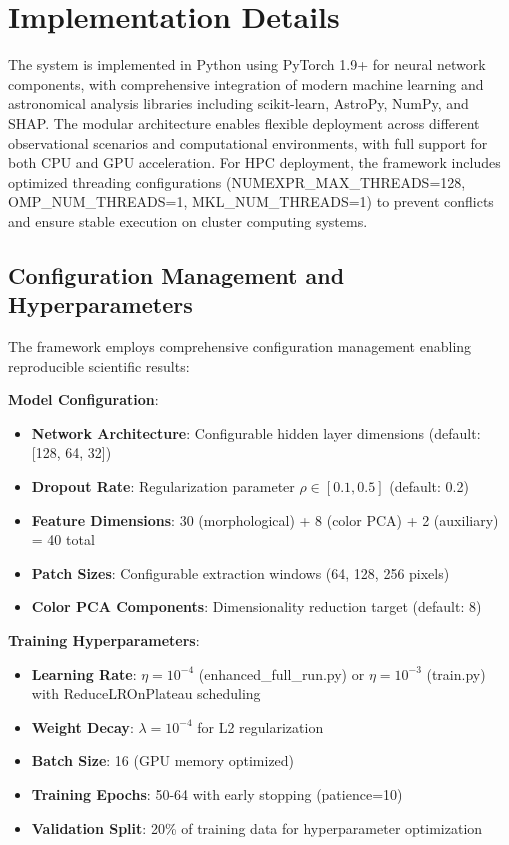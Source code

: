 \documentclass[twocolumn,10pt]{aastex631}
\begin{document}
\section{Implementation Details}

The system is implemented in Python using PyTorch 1.9+ for neural network components, with comprehensive integration of modern machine learning and astronomical analysis libraries including scikit-learn, AstroPy, NumPy, and SHAP. The modular architecture enables flexible deployment across different observational scenarios and computational environments, with full support for both CPU and GPU acceleration. For HPC deployment, the framework includes optimized threading configurations (NUMEXPR\_MAX\_THREADS=128, OMP\_NUM\_THREADS=1, MKL\_NUM\_THREADS=1) to prevent conflicts and ensure stable execution on cluster computing systems.

\subsection{Configuration Management and Hyperparameters}

The framework employs comprehensive configuration management enabling reproducible scientific results:

\textbf{Model Configuration}:
\begin{itemize}
\item \textbf{Network Architecture}: Configurable hidden layer dimensions (default: [128, 64, 32])
\item \textbf{Dropout Rate}: Regularization parameter $\rho \in [0.1, 0.5]$ (default: 0.2)
\item \textbf{Feature Dimensions}: 30 (morphological) + 8 (color PCA) + 2 (auxiliary) = 40 total
\item \textbf{Patch Sizes}: Configurable extraction windows (64, 128, 256 pixels)
\item \textbf{Color PCA Components}: Dimensionality reduction target (default: 8)
\end{itemize}

\textbf{Training Hyperparameters}:
\begin{itemize}
\item \textbf{Learning Rate}: $\eta = 10^{-4}$ (enhanced\_full\_run.py) or $\eta = 10^{-3}$ (train.py) with ReduceLROnPlateau scheduling
\item \textbf{Weight Decay}: $\lambda = 10^{-4}$ for L2 regularization
\item \textbf{Batch Size}: 16 (GPU memory optimized)
\item \textbf{Training Epochs}: 50-64 with early stopping (patience=10)
\item \textbf{Validation Split}: 20\% of training data for hyperparameter optimization
\end{itemize}
\end{document}
